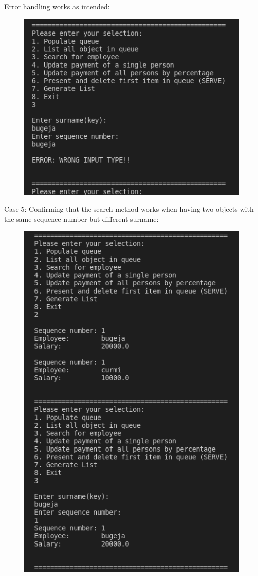 \documentclass[12pt]{article}
\begin{document}
Error handling works as intended:
\bigskip
\begin{figure}[h]
\centering
\includegraphics[scale=0.30]{Images/Testing 3/4.png}
\end{figure}

\newpage
Case 5: Confirming that the search method works when having two objects with the same sequence number but different surname:
\bigskip
\begin{figure}[h]
\centering
\includegraphics[scale=0.30]{Images/Testing 3/2.png}
\end{figure}
\end{document}
